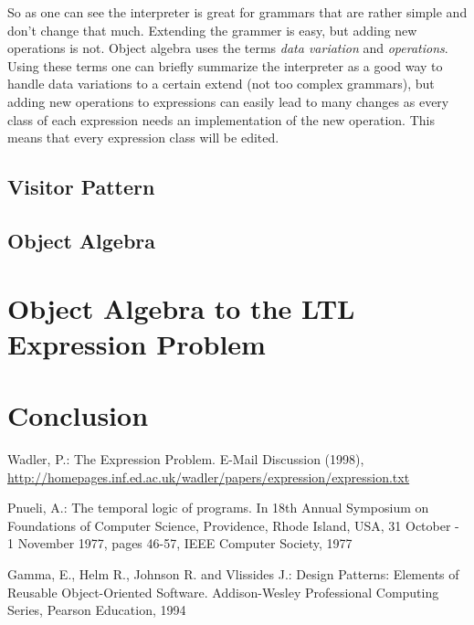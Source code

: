 \documentclass{llncs}
\begin{document}
So as one can see the interpreter is great for grammars that are rather simple and don't change that much. Extending the grammer is easy, but adding new operations is not. Object algebra uses the terms \emph{data variation} and \emph{operations}. Using these terms one can briefly summarize the interpreter as a good way to handle data variations to a certain extend (not too complex grammars), but adding new operations to expressions can easily lead to many changes as every class of each expression needs an implementation of the new operation. This means that every expression class will be edited.



\subsection{Visitor Pattern} \label{ssec:visitor}
\subsection{Object Algebra} \label{ssec:oa}
\section{Object Algebra to the LTL Expression Problem} \label{sec:oa-ltl}
\section{Conclusion} \label{sec:conclusion}

%
%
\begin{thebibliography}{5}
%

Wadler, P.:
The Expression Problem.
E-Mail Discussion (1998),
\url{http://homepages.inf.ed.ac.uk/wadler/papers/expression/expression.txt}

Pnueli, A.:
The temporal logic of programs.
In 18th Annual Symposium on Foundations of Computer Science, Providence, Rhode Island, USA, 31 October - 1 November 1977, pages 46-57, IEEE Computer Society, 1977

Gamma, E., Helm R., Johnson R. and Vlissides J.:
Design Patterns: Elements of Reusable Object-Oriented Software.
Addison-Wesley Professional Computing Series, Pearson Education, 1994

%
%
%

\end{thebibliography}
\end{document}
